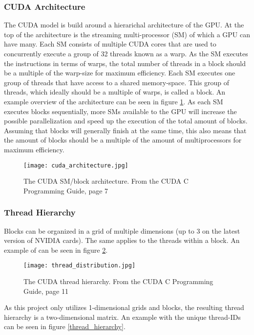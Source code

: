 \subsubsection{CUDA Architecture}
The CUDA model is build around a hierarichal architecture of the GPU. 
At the top of the architecture is the streaming multi-processor (SM) of which a GPU can have many. 
Each SM consists of multiple CUDA cores that are used to concurrently execute a group of 32 threads known as a warp. 
As the SM executes the instructions in terms of warps, the total number of threads in a block should be a multiple of the warp-size for maximum efficiency.
Each SM executes one group of threads that have access to a shared memory-space.
This group of threads, which ideally should be a multiple of warps, is called a block. 
An example overview of the architecture can be seen in figure \ref{cuda_architecture}.
As each SM executes blocks sequentially, more SMs available to the GPU will increase the possible parallelization and speed up the execution of the total amount of blocks. 
Assuming that blocks will generally finish at the same time, this also means that the amount of blocks should be a multiple of the amount of multiprocessors for maximum efficiency.

\begin{figure}[h!]\centering
\texttt{[image: cuda\_architecture.jpg]}
\caption{The CUDA SM/block architecture. From the CUDA C Programming Guide, page 7 \cite{nvidia2014programming}\label{cuda_architecture}}
\end{figure}

\subsubsection{Thread Hierarchy}
Blocks can be organized in a grid of multiple dimensions (up to 3 on the latest version of NVIDIA cards). 
The same applies to the threads within a block.
An example of can be seen in figure \ref{thread_distribution}.

\begin{figure}[h!]\centering
\texttt{[image: thread\_distribution.jpg]}
\caption{The CUDA thread hierarchy. From the CUDA C Programming Guide, page 11 \cite{nvidia2014programming}\label{thread_distribution}}
\end{figure}

As this project only utilizes 1-dimensional grids and blocks, the resulting thread hierarchy is a two-dimensional matrix. 
An example with the unique thread-IDs can be seen in figure \ref{thread_hierarchy}.

